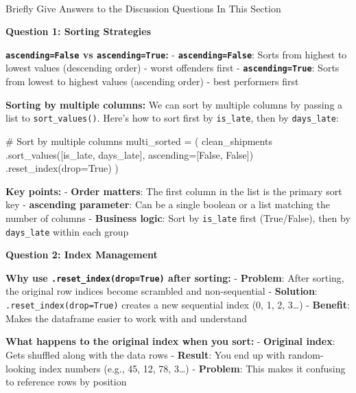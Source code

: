 \documentclass[
  letterpaper,
  DIV=11,
  numbers=noendperiod]{scrartcl}
\makeatletter
\let\oldparagraph\paragraph
\renewcommand{\paragraph}{
    \@ifstar
      \xxxParagraphStar
      \xxxParagraphNoStar
  }
\newcommand{\xxxParagraphStar}[1]{\oldparagraph*{#1}\mbox{}}
\newcommand{\xxxParagraphNoStar}[1]{\oldparagraph{#1}\mbox{}}
\newenvironment{Shaded}{\begin{snugshade}}{\end{snugshade}}
\newcommand{\CommentTok}[1]{\textcolor[rgb]{0.37,0.37,0.37}{#1}}
\newcommand{\NormalTok}[1]{\textcolor[rgb]{0.00,0.23,0.31}{#1}}
\newcommand{\OperatorTok}[1]{\textcolor[rgb]{0.37,0.37,0.37}{#1}}
\newcommand{\StringTok}[1]{\textcolor[rgb]{0.13,0.47,0.30}{#1}}
\newcommand{\VariableTok}[1]{\textcolor[rgb]{0.07,0.07,0.07}{#1}}
\makeatother
\begin{document}
\paragraph{Briefly Give Answers to the Discussion Questions In This
Section}\label{briefly-give-answers-to-the-discussion-questions-in-this-section-3}

\textbf{Question 1: Sorting Strategies}

\textbf{\texttt{ascending=False} vs \texttt{ascending=True}:} -
\textbf{\texttt{ascending=False}}: Sorts from highest to lowest values
(descending order) - worst offenders first -
\textbf{\texttt{ascending=True}}: Sorts from lowest to highest values
(ascending order) - best performers first

\textbf{Sorting by multiple columns:} We can sort by multiple columns by
passing a list to \texttt{sort\_values()}. Here's how to sort first by
\texttt{is\_late}, then by \texttt{days\_late}:

\begin{Shaded}
\begin{Highlighting}[]
\CommentTok{\# Sort by multiple columns}
\NormalTok{multi\_sorted }\OperatorTok{=}\NormalTok{ (}
\NormalTok{    clean\_shipments}
\NormalTok{    .sort\_values([}\StringTok{\textquotesingle{}is\_late\textquotesingle{}}\NormalTok{, }\StringTok{\textquotesingle{}days\_late\textquotesingle{}}\NormalTok{], ascending}\OperatorTok{=}\NormalTok{[}\VariableTok{False}\NormalTok{, }\VariableTok{False}\NormalTok{])}
\NormalTok{    .reset\_index(drop}\OperatorTok{=}\VariableTok{True}\NormalTok{)}
\NormalTok{)}
\end{Highlighting}
\end{Shaded}

\textbf{Key points:} - \textbf{Order matters}: The first column in the
list is the primary sort key - \textbf{ascending parameter}: Can be a
single boolean or a list matching the number of columns -
\textbf{Business logic}: Sort by \texttt{is\_late} first (True/False),
then by \texttt{days\_late} within each group

\textbf{Question 2: Index Management}

\textbf{Why use \texttt{.reset\_index(drop=True)} after sorting:} -
\textbf{Problem}: After sorting, the original row indices become
scrambled and non-sequential - \textbf{Solution}:
\texttt{.reset\_index(drop=True)} creates a new sequential index (0, 1,
2, 3\ldots) - \textbf{Benefit}: Makes the dataframe easier to work with
and understand

\textbf{What happens to the original index when you sort:} -
\textbf{Original index}: Gets shuffled along with the data rows -
\textbf{Result}: You end up with random-looking index numbers (e.g., 45,
12, 78, 3\ldots) - \textbf{Problem}: This makes it confusing to
reference rows by position
\end{document}
